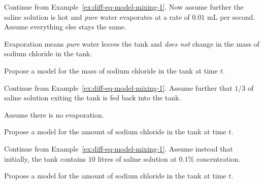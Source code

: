 \documentclass[../main.tex]{subfiles}
\begin{document}
\begin{example} \label{ex:diff-eq-model-mixing-2}
  Continue from Example~\ref{ex:diff-eq-model-mixing-1}. Now assume further the saline solution is hot and \emph{pure} water evaporates at a rate of \(0.01\) mL per second.  Assume everything else stays the same.

  Evaporation means \emph{pure} water leaves the tank and \emph{does not} change in the mass of sodium chloride in the tank.

  Propose a model for the mass of sodium chloride in the tank at time \(t\). 
\end{example}
\clearpage

\begin{example} \label{ex:diff-eq-model-mixing-3}
  Continue from Example~\ref{ex:diff-eq-model-mixing-1}. Assume further that \(1/3\) of saline solution exiting the tank is fed back into the tank. 

  Assume there is no evaporation.

  Propose a model for the amount of sodium chloride in the tank at time \(t\). 
\end{example}
\clearpage

\begin{example}
  Continue from Example~\ref{ex:diff-eq-model-mixing-1}. Assume instead that initially, the tank contains \(10\) litres of saline solution at \(0.1\%\) concentration.

  Propose a model for the amount of sodium chloride in the tank at time \(t\). 
\end{example}
\end{document}
